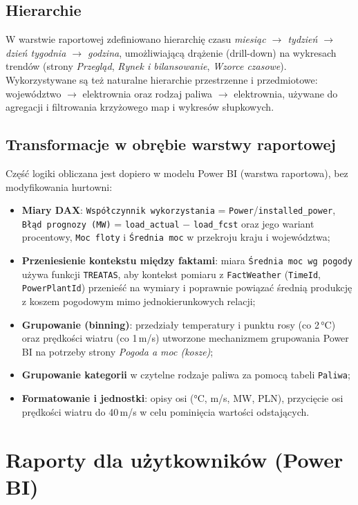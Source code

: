 \documentclass[12pt]{article}
\begin{document}
	\subsection{Hierarchie}
	W warstwie raportowej zdefiniowano hierarchię czasu \textit{miesiąc $\rightarrow$ tydzień $\rightarrow$ dzień tygodnia $\rightarrow$ godzina}, umożliwiającą drążenie (drill-down) na wykresach trendów (strony \textit{Przegląd}, \textit{Rynek i bilansowanie}, \textit{Wzorce czasowe}). Wykorzystywane są też naturalne hierarchie przestrzenne i przedmiotowe: województwo $\rightarrow$ elektrownia oraz rodzaj paliwa $\rightarrow$ elektrownia, używane do agregacji i filtrowania krzyżowego map i wykresów słupkowych.

	\subsection{Transformacje w obrębie warstwy raportowej}
	Część logiki obliczana jest dopiero w modelu Power BI (warstwa raportowa), bez modyfikowania hurtowni:
	\begin{itemize}
		\item \textbf{Miary DAX}: \texttt{Współczynnik wykorzystania} = \texttt{Power}/\texttt{installed\_power}, \texttt{Błąd prognozy (MW)} = \texttt{load\_actual} $-$ \texttt{load\_fcst} oraz jego wariant procentowy, \texttt{Moc floty} i \texttt{Średnia moc} w przekroju kraju i województwa;
		\item \textbf{Przeniesienie kontekstu między faktami}: miara \texttt{Średnia moc wg pogody} używa funkcji \texttt{TREATAS}, aby kontekst pomiaru z \texttt{FactWeather} (\texttt{TimeId}, \texttt{PowerPlantId}) przenieść na wymiary i poprawnie powiązać średnią produkcję z koszem pogodowym mimo jednokierunkowych relacji;
		\item \textbf{Grupowanie (binning)}: przedziały temperatury i punktu rosy (co 2\,°C) oraz prędkości wiatru (co 1\,m/s) utworzone mechanizmem grupowania Power BI na potrzeby strony \textit{Pogoda a moc (kosze)};
		\item \textbf{Grupowanie kategorii} w czytelne rodzaje paliwa za pomocą tabeli \texttt{Paliwa};
		\item \textbf{Formatowanie i jednostki}: opisy osi (°C, m/s, MW, PLN), przycięcie osi prędkości wiatru do 40\,m/s w celu pominięcia wartości odstających.
	\end{itemize}

	\section{Raporty dla użytkowników (Power BI)}
\end{document}
